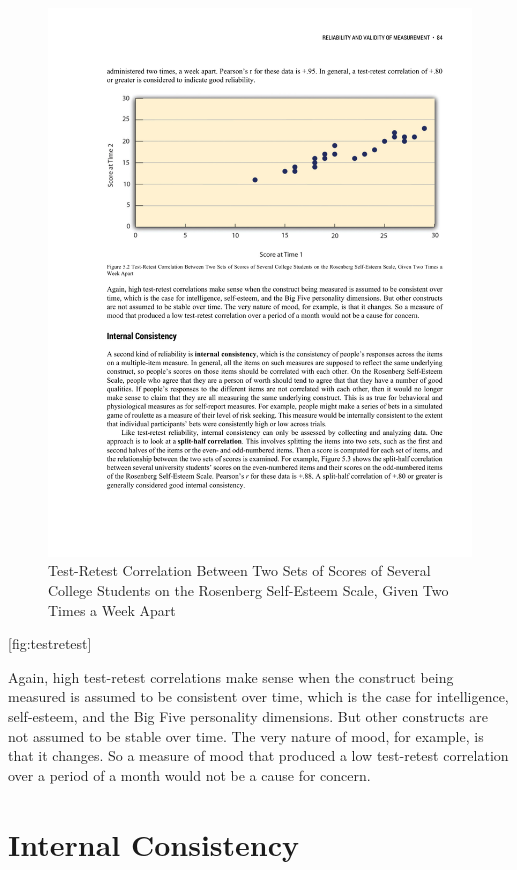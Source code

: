 \documentclass[]{book}
\theoremstyle{definition}
\theoremstyle{definition}
\theoremstyle{remark}
\begin{document}
\begin{figure}[htbp]
\centering
\includegraphics{figures/C5testretest.pdf}
\caption{Test-Retest Correlation Between Two Sets of Scores of Several
College Students on the Rosenberg Self-Esteem Scale, Given Two Times a
Week Apart}
\end{figure}

{[}fig:testretest{]}

Again, high test-retest correlations make sense when the construct being
measured is assumed to be consistent over time, which is the case for
intelligence, self-esteem, and the Big Five personality dimensions. But
other constructs are not assumed to be stable over time. The very nature
of mood, for example, is that it changes. So a measure of mood that
produced a low test-retest correlation over a period of a month would
not be a cause for concern.

\section{Internal Consistency}\label{internal-consistency}
\end{document}
